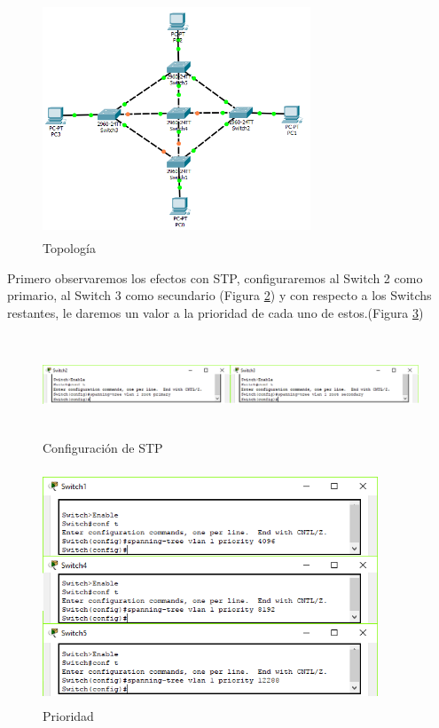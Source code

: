 \documentclass{article}
\begin{document}
\begin{figure}[h!]
\centering
\includegraphics[height=7cm,width=8cm]{sshot-1.png}
\caption{Topología}
\label{fig:top}
\end{figure}

Primero observaremos los efectos con STP, configuraremos al Switch 2 como primario, al Switch 3 como secundario (Figura \ref{fig:config}) y con respecto a los Switchs restantes, le daremos un valor a la prioridad de cada uno de estos.(Figura \ref{fig:prio})

\begin{figure}[h!]
\centering
\includegraphics[height=3cm,width=15.2cm]{Primary.png}
\caption{Configuración de STP}
\label{fig:config}
\end{figure}

\newpage

\begin{figure}[h!]
\centering
\includegraphics[height=7cm,width=10cm]{priority1.png}
\caption{Prioridad}
\label{fig:prio}
\end{figure}
\end{document}
